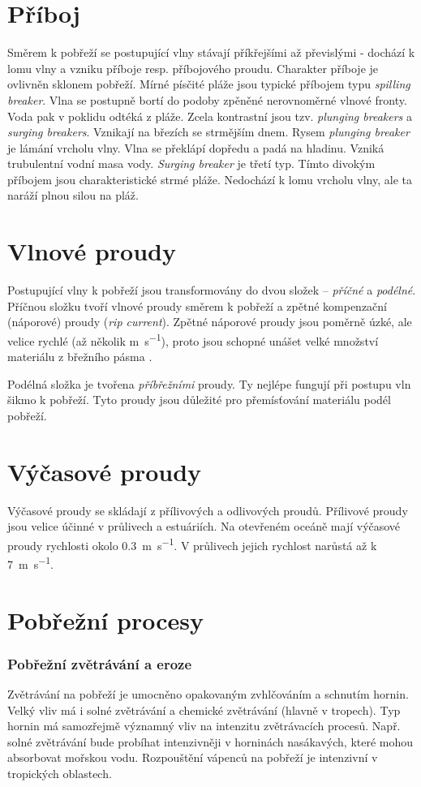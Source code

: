 \section{Příboj}
Směrem k pobřeží se postupující vlny stávají příkřejšími až převislými - dochází k lomu vlny a vzniku příboje resp. příbojového proudu. Charakter příboje je ovlivněn sklonem pobřeží. Mírné písčité pláže jsou typické příbojem typu \textit{spilling breaker}. Vlna se postupně bortí do podoby zpěněné nerovnoměrné vlnové fronty. Voda pak v poklidu odtéká z pláže. Zcela kontrastní jsou tzv. \textit{plunging breakers} a \textit{surging breakers}. Vznikají na březích se strmějším dnem. Rysem \textit{plunging breaker} je lámání vrcholu vlny. Vlna se překlápí dopředu a padá na hladinu. Vzniká trubulentní vodní masa vody. \textit{Surging breaker} je třetí typ. Tímto divokým příbojem jsou charakteristické strmé pláže. Nedochází k lomu vrcholu vlny, ale ta naráží plnou silou na pláž.

\section{Vlnové proudy}
Postupující vlny k pobřeží jsou transformovány do dvou složek -- \emph{příčné} a \emph{podélné}. Příčnou složku tvoří vlnové proudy směrem k pobřeží a zpětné kompenzační (náporové) proudy (\textit{rip current}). Zpětné náporové proudy jsou poměrně úzké, ale velice rychlé (až několik \si{\metre\per\second}), proto jsou schopné unášet velké množství materiálu z břežního pásma \parencite{demekObecnaGeomorfologie1987}. 

Podélná složka je tvořena \emph{příbřežními} proudy. Ty nejlépe fungují při postupu vln šikmo k pobřeží. Tyto proudy jsou důležité pro přemísťování materiálu podél pobřeží.

\section{Výčasové proudy}
Výčasové proudy se skládají z přílivových a odlivových proudů. Přílivové proudy jsou velice účinné v průlivech a estuáriích. Na otevřeném oceáně mají výčasové proudy rychlosti okolo \SI{0,3}{\metre\per\second}. V průlivech jejich rychlost narůstá až k \SI{7}{\metre\per\second}.

\section{Pobřežní procesy}
\subsubsection{Pobřežní zvětrávání a eroze}
Zvětrávání na pobřeží je umocněno opakovaným zvhlčováním a schnutím hornin. Velký vliv má i solné zvětrávání a chemické zvětrávání (hlavně v tropech). Typ hornin má samozřejmě významný vliv na intenzitu zvětrávacích procesů. Např. solné zvětrávání bude probíhat intenzivněji v horninách nasákavých, které mohou absorbovat mořskou vodu. Rozpouštění vápenců na pobřeží je intenzivní v tropických oblastech.

